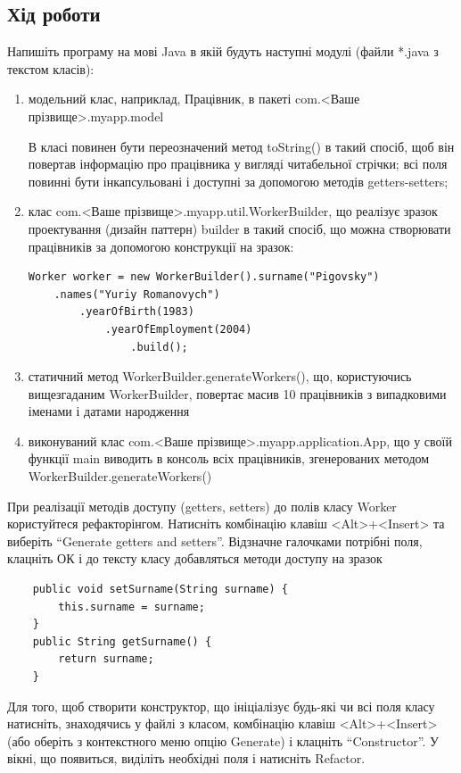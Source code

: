 \subsection{Хід роботи}
Напишіть програму на мові Java в якій будуть наступні модулі (файли *.java з текстом класів):
\begin{enumerate}
\item модельний клас, наприклад, Працівник, в пакеті com.<Ваше прізвище>.myapp.model

В класі повинен бути переозначений метод toString() в такий спосіб, щоб він повертав інформацію про працівника у вигляді читабельної стрічки; всі поля повинні бути інкапсульовані і доступні за допомогою методів getters-setters;
\item  клас com.<Ваше прізвище>.myapp.util.WorkerBuilder, що реалізує зразок проектування (дизайн паттерн) builder в такий спосіб, що можна створювати працівників за допомогою конструкції на зразок:
\begin{lstlisting}
Worker worker = new WorkerBuilder().surname("Pigovsky")
    .names("Yuriy Romanovych")
        .yearOfBirth(1983)
            .yearOfEmployment(2004)
                .build();
\end{lstlisting}
\item статичний метод WorkerBuilder.generateWorkers(), що, користуючись вищезгаданим WorkerBuilder, повертає масив 10 працівників з випадковими іменами і датами народження 
\item виконуваний клас com.<Ваше прізвище>.myapp.application.App, що у своїй функції main виводить в консоль всіх працівників, згенерованих методом WorkerBuilder.generateWorkers()
\end{enumerate}

 При реалізації методів доступу (getters, setters) до  полів класу Worker користуйтеся  рефакторінгом. Натисніть комбінацію клавіш <Alt>+<Insert> та виберіть ``Generate getters and setters''.
Відзначне галочками потрібні поля, клацніть ОК і до тексту класу добавляться методи доступу на зразок
\begin{lstlisting}
    public void setSurname(String surname) {
        this.surname = surname;
    }
    public String getSurname() {
        return surname;
    }
\end{lstlisting}

Для того, щоб створити конструктор, що ініціалізує будь-які чи всі поля класу натисніть, знаходячись у файлі з класом, комбінацію клавіш <Alt>+<Insert> (або оберіть з контекстного меню опцію Generate) і клацніть ``Constructor''. У вікні, що появиться, виділіть необхідні поля і натисніть Refactor.

